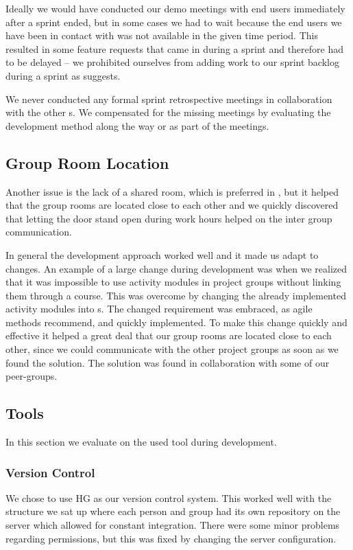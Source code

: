 Ideally we would have conducted our demo meetings with end users immediately after a sprint ended, but in some cases we had to wait because the end users we have been in contact with was not available in the given time period.
This resulted in some feature requests that came in during a sprint and therefore had to be delayed -- we prohibited ourselves from adding work to our sprint backlog during a sprint as \scrum{} suggests.

We never conducted any formal sprint retrospective meetings in collaboration with the other \subgroup{}s.
We compensated for the missing meetings by evaluating the development method along the way or as part of the \sos{} meetings. 





\subsection{Group Room Location}
Another issue is the lack of a shared room, which is preferred in \sos{}, but it helped that the group rooms are located close to each other and we quickly discovered that letting the door stand open during work hours helped on the inter group communication. 

In general the development approach worked well and it made us adapt to changes. 
An example of a large change during development was when we realized that it was impossible to use activity modules in project groups without linking them through a course.
This was overcome by changing the already implemented activity modules into \block[]s. 
The changed requirement was embraced, as agile methods recommend, and quickly implemented.
To make this change quickly and effective it helped a great deal that our group rooms are located close to each other, since we could communicate with the other project groups as soon as we found the solution.
The solution was found in collaboration with some of our peer-groups.



\subsection{Tools}
In this section we evaluate on the used tool during development. 

\subsubsection{Version Control}
We chose to use HG as our version control system. 
This worked well with the structure we sat up where each person and group had its own repository on the server which allowed for constant integration. 
There were some minor problems regarding permissions, but this was fixed by changing the server configuration. 


